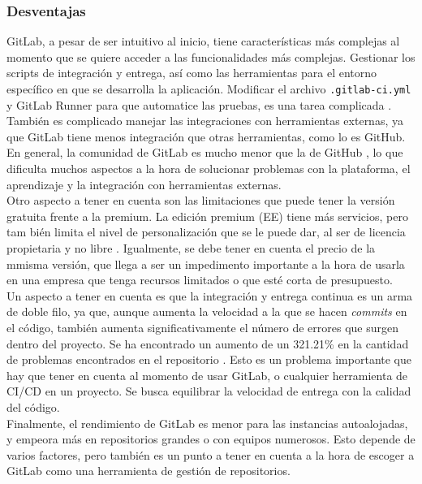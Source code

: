 \documentclass[runningheads]{llncs}
\begin{document}
\subsubsection{Desventajas}
GitLab, a pesar de ser intuitivo al inicio, tiene características más complejas al momento que se quiere acceder a las funcionalidades más complejas.
Gestionar los scripts de integración y entrega, así como las herramientas para el entorno específico en que se desarrolla la aplicación. Modificar el
archivo \texttt{.gitlab-ci.yml} y GitLab Runner para que automatice las pruebas, es una tarea complicada \cite{alvin2023devops}.\\
También es complicado manejar las integraciones con herramientas externas, ya que GitLab tiene menos integración que otras herramientas, como lo es
GitHub. En general, la comunidad de GitLab es mucho menor que la de GitHub \cite{devineni1version}, lo que dificulta muchos aspectos a la hora de solucionar problemas con la
plataforma, el aprendizaje y la integración con herramientas externas.\\
Otro aspecto a tener en cuenta son las limitaciones que puede tener la versión gratuita frente a la premium. La edición premium (EE) tiene más servicios,
pero tam bién limita el nivel de personalización que se le puede dar, al ser de licencia propietaria y no libre \cite{uddin2023comparative}. Igualmente, se
debe tener en cuenta el precio de la mmisma versión, que llega a ser un impedimento importante a la hora de usarla en una empresa que tenga recursos limitados
o que esté corta de presupuesto.\\
Un aspecto a tener en cuenta es que la integración y entrega continua es un arma de doble filo, ya que, aunque aumenta la velocidad a la que se hacen
\textit{commits} en el código, también aumenta significativamente el número de errores que surgen dentro del proyecto. Se ha encontrado un aumento de un
321.21\% en la cantidad de problemas encontrados en el repositorio \cite{fairbanks2023analyzing}. Esto es un problema importante que hay que tener en cuenta
al momento de usar GitLab, o cualquier herramienta de CI/CD en un proyecto. Se busca equilibrar la velocidad de entrega con la calidad del código.\\
Finalmente, el rendimiento de GitLab es menor para las instancias autoalojadas, y empeora más en repositorios grandes o con equipos numerosos. Esto depende
de varios factores, pero también es un punto a tener en cuenta a la hora de escoger a GitLab como una herramienta de gestión de repositorios.
\end{document}
